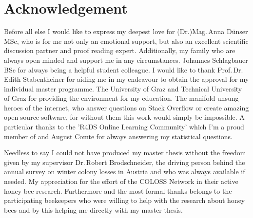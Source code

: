 \chapter*{Acknowledgement}
\label{sec:acknowledgement}
\vspace*{-10mm}

Before all else I would like to express my deepest love for (Dr.)Mag.\,Anna Dünser\,MSc, who is for me not only an emotional support, but also an excellent scientific discussion partner and proof reading expert. Additionally, my family who are always open minded and support me in any circumstances. Johannes Schlagbauer\,BSc for always being a helpful student colleague. I would like to thank Prof.\,Dr.\,Edith Stabentheiner for aiding me in my endeavour to obtain the approval for my individual master programme. The University of Graz and Technical University of Graz for providing the environment for my education. The manifold unsung heroes of the internet, who answer questions on Stack Overflow or create amazing open-source software, for without them this work would simply be impossible. A particular thanks to the 'R4DS Online Learning Community' which I'm a proud member of and August Comte for always answering my statistical questions.

Needless to say I could not have produced my master thesis without the freedom given by my supervisor Dr.\,Robert Brodschneider, the driving person behind the annual survey on winter colony losses in Austria and who was always available if needed. My appreciation for the effort of the COLOSS Network in their active honey bee research. Furthermore and the most formal thanks belongs to the participating beekeepers who were willing to help with the research about honey bees and by this helping me directly with my master thesis.